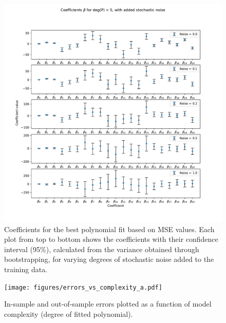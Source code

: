 \begin{figure}[h]
    \includegraphics[width = 0.8\paperwidth]{figures/best_coeff_vs_noise_ols.pdf}
    \caption{Coefficients for the best polynomial fit based on MSE values. Each plot from top to bottom
	shows the coefficients with their confidence interval (95\%), calculated from the variance obtained
	through bootstrapping, for varying degrees of stochastic noise added to the training data.}
    \label{fig:ols-coeff-noise}
\end{figure}

\begin{figure}[h]
    \texttt{[image: figures/errors\_vs\_complexity\_a.pdf]}
    \caption{In-sample and out-of-sample errors plotted as a function of model complexity (degree of fitted
	polynomial).}
    \label{fig:ols-errors-complexity}
\end{figure}
